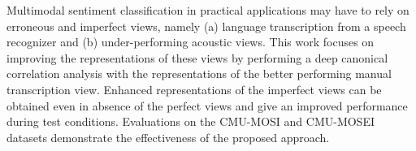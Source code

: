 Multimodal sentiment classification in practical applications may have to rely on erroneous and imperfect views, namely (a) language transcription from a speech recognizer and (b) under-performing acoustic views. This work focuses on improving the representations of these views by performing a deep canonical correlation analysis with the representations of the better performing manual transcription view. Enhanced representations of the imperfect views can be obtained even in absence of the perfect views and give an improved performance during test conditions. Evaluations on the CMU-MOSI and CMU-MOSEI datasets demonstrate the effectiveness of the proposed approach.
